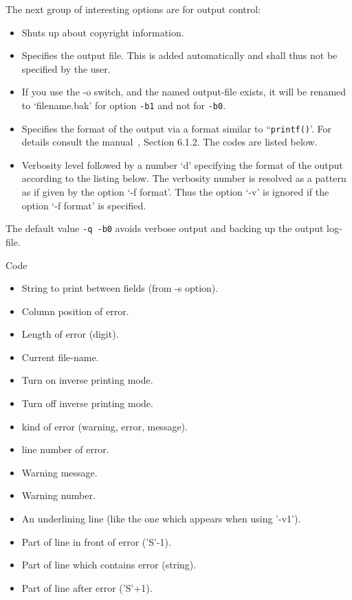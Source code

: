 The next group of interesting options are for output control: 
%
\begin{itemize}
\item['-q']
Shuts up about copyright information.
\item['-o output-file']
Specifies the output file. This is added automatically 
and shall thus not be specified by the user. 
\item['-b0/1']
If you use the -o switch, and the named output-file exists,
it will be renamed to `filename.bak' for option \texttt{-b1} 
and not for \texttt{-b0}.
\item['-f format']
Specifies the format of the output 
via a format similar to ``\texttt{printf()}'. %
For details consult the manual~\cite{ChkTeX22}, Section 6.1.2. 
The codes are listed below. 
\item['-vd']
Verbosity level followed by a number `d' 
specifying the format of the output according to the listing below. 
The verbosity number is resolved as a pattern 
as if given by the option `-f format'. 
Thus the option `-v' is ignored 
if the option `-f format' is specified. 
\end{itemize}

The default value \texttt{-q -b0} 
avoids verbose output and backing up the output log-file. 

Code
%
\begin{itemize}
\item[\%b]
String to print between fields (from -s option).
\item[\%c]
Column position of error.
\item[\%d]
Length of error (digit).
\item[\%f]
Current file-name.
\item[\%i]
Turn on inverse printing mode.
\item[\%I]
Turn off inverse printing mode.
\item[\%k]
kind of error (warning, error, message).
\item[\%l]
line number of error.
\item[\%m]
Warning message.
\item[\%n]
Warning number.
\item[\%u]
An underlining line (like the one which appears when using '-v1').
\item[\%r]
Part of line in front of error ('S'-1).
\item[\%s]
Part of line which contains error (string).
\item[\%t]
Part of line after error ('S'+1).
\end{itemize}



